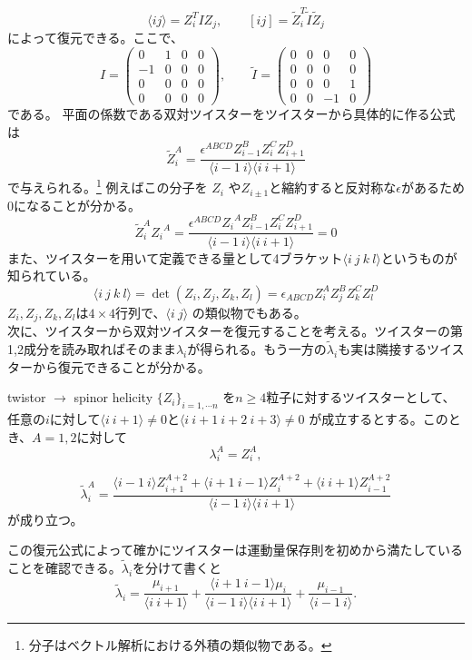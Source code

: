 \documentclass[uplatex,dvipdfmx,a4paper,11pt]{jsarticle}
\numberwithin{equation}{section}
\begin{document}
\[
\langle ij\rangle=Z_i^{T}IZ_j,
\qquad
[ij]=\tilde Z_i^{T}\tilde I\tilde Z_j
\]
によって復元できる。ここで、
\[
I=
\begin{pmatrix}
0&1&0&0\\
-1&0&0&0\\
0&0&0&0\\
0&0&0&0
\end{pmatrix},
\qquad
\tilde I=
\begin{pmatrix}
0&0&0&0\\
0&0&0&0\\
0&0&0&1\\
0&0&-1&0
\end{pmatrix}
\]
である。
平面の係数である双対ツイスターをツイスターから具体的に作る公式は
\begin{equation}
  \tilde Z_i^A
=
\frac{
\epsilon^{ABCD}
Z_{i-1}^B Z_i^C Z_{i+1}^D
}{
\langle i-1\ i\rangle
\langle i\ i+1\rangle
}
\end{equation}
で与えられる。\footnote{分子はベクトル解析における外積の類似物である。}
例えばこの分子を \(Z_i\) や\(Z_{i\pm1}\)と縮約すると反対称な$\epsilon$があるため0になることが分かる。
\[
\tilde Z_i^A {Z_i}^A
=
\frac{
\epsilon^{ABCD}{Z_i}^A
Z_{i-1}^B Z_i^C Z_{i+1}^D
}{
\langle i-1\ i\rangle
\langle i\ i+1\rangle
} = 0
\]
また、ツイスターを用いて定義できる量として4ブラケット$\langle i\ j\ k\ l\rangle$というものが知られている。
\[
\langle i\ j\ k\ l\rangle
=
\det(Z_i,Z_j,Z_k,Z_l) = \epsilon_{ABCD}Z^A_i Z^B_j Z^C_k Z^D_l
\]
$Z_i,Z_j,Z_k,Z_l$は$4\times 4$行列で、$\langle i\ j\rangle$ の類似物でもある。\\
次に、ツイスターから双対ツイスターを復元することを考える。ツイスターの第1,2成分を読み取ればそのまま$\lambda_i$が得られる。もう一方の$\tilde{\lambda}_i$も実は隣接するツイスターから復元できることが分かる。
\begin{mythm}{twistor $\to$ spinor helicity}
  $\{Z_i\}_{i=1,\cdots n}$ を$n\geq 4$粒子に対するツイスターとして、任意の$i$に対して$\langle i\ i+1\rangle\neq 0$と$\langle i\ i+1\ i+2\ i+3\rangle\neq 0$ が成立するとする。このとき、$A=1,2$に対して
\[
\lambda_i^A=Z_i^A,
\]

\[
\tilde\lambda_i^A=
\frac{
\langle i-1\ i\rangle Z_{i+1}^{A+2}
+\langle i+1\ i-1\rangle Z_i^{A+2}
+\langle i\ i+1\rangle Z_{i-1}^{A+2}
}{
\langle i-1\ i\rangle\langle i\ i+1\rangle
}
\]
が成り立つ。
\end{mythm}
この復元公式によって確かにツイスターは運動量保存則を初めから満たしていることを確認できる。$\tilde{\lambda}_i$を分けて書くと
\[
\tilde\lambda_i
=
\frac{\mu_{i+1}}{\langle i\ i+1\rangle}
+
\frac{\langle i+1\ i-1\rangle\mu_i}
{\langle i-1\ i\rangle\langle i\ i+1\rangle}
+
\frac{\mu_{i-1}}{\langle i-1\ i\rangle}.
\]
\end{document}
